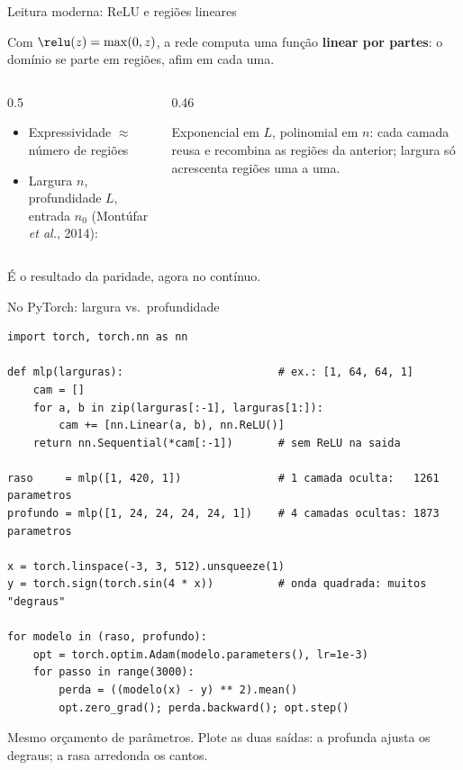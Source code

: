 \documentclass[aspectratio=169, 11pt]{beamer}
\begin{document}
\begin{frame}{Leitura moderna: ReLU e regiões lineares}

  Com $\relu(z) = \max(0, z)$, a rede computa uma função \textbf{linear por
  partes}: o domínio se parte em regiões, afim em cada uma.

  \medskip
  \begin{columns}[T]
    \begin{column}{0.5\textwidth}
      \begin{itemize}\setlength{\itemsep}{0.25ex}
        \item Expressividade $\approx$ número de regiões
        \item Largura $n$, profundidade $L$, entrada $n_0$
              (Montúfar \emph{et al.}, 2014):
      \end{itemize}
      \smallskip
    \end{column}
    \begin{column}{0.46\textwidth}
      \begin{ideiabox}
        Exponencial em $L$, polinomial em $n$: cada camada reusa e
        recombina as regiões da anterior; largura só acrescenta regiões
        uma a uma.
      \end{ideiabox}
    \end{column}
  \end{columns}

  \medskip
  É o resultado da paridade, agora no contínuo.
\end{frame}

\begin{frame}[fragile]{No PyTorch: largura vs.\ profundidade}

\begin{lstlisting}
import torch, torch.nn as nn

def mlp(larguras):                        # ex.: [1, 64, 64, 1]
    cam = []
    for a, b in zip(larguras[:-1], larguras[1:]):
        cam += [nn.Linear(a, b), nn.ReLU()]
    return nn.Sequential(*cam[:-1])       # sem ReLU na saida

raso     = mlp([1, 420, 1])               # 1 camada oculta:   1261 parametros
profundo = mlp([1, 24, 24, 24, 24, 1])    # 4 camadas ocultas: 1873 parametros

x = torch.linspace(-3, 3, 512).unsqueeze(1)
y = torch.sign(torch.sin(4 * x))          # onda quadrada: muitos "degraus"

for modelo in (raso, profundo):
    opt = torch.optim.Adam(modelo.parameters(), lr=1e-3)
    for passo in range(3000):
        perda = ((modelo(x) - y) ** 2).mean()
        opt.zero_grad(); perda.backward(); opt.step()
\end{lstlisting}

  \smallskip
  {\small Mesmo orçamento de parâmetros. Plote as duas saídas: a profunda
  ajusta os degraus; a rasa arredonda os cantos.}
\end{frame}
\end{document}
